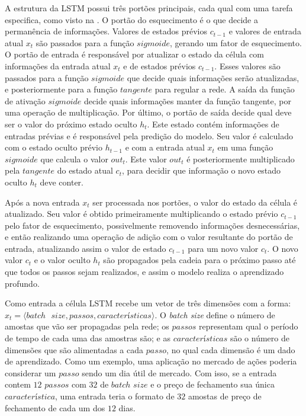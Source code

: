 
A estrutura da LSTM possui três portões principais, cada qual com uma tarefa especifica, como visto na . O portão do esquecimento é o que decide a permanência de informações. Valores de estados prévios $c_{t-1}$ e valores de entrada atual $x_t$ são passados para a função $sigmoide$, gerando um fator de esquecimento. O portão de entrada é responsável por atualizar o estado da célula com informações da entrada atual $x_t$ e de estados prévios $c_{t-1}$. Esses valores são passados para a função $sigmoide$ que decide quais informações serão atualizadas, e posteriormente para a função $tangente$ para regular a rede. A saída da função de ativação $sigmoide$ decide quais informações manter da função tangente, por uma operação de multiplicação. Por último, o portão de saída decide qual deve ser o valor do próximo estado oculto $h_t$. Este estado contém informações de entradas prévias e é responsável pela predição do modelo. Seu valor é calculado com o estado oculto prévio $h_{t-1}$ e com a entrada atual $x_t$ em uma função $sigmoide$ que calcula o valor $out_t$. Este valor $out_t$ é posteriormente multiplicado pela $tangente$ do estado atual $c_t$, para decidir que informação o novo estado oculto $h_t$ deve conter.

Após a nova entrada $x_t$ ser processada nos portões, o valor do estado da célula é atualizado. Seu valor é obtido primeiramente multiplicando o estado prévio $c_{t-1}$ pelo fator de esquecimento, possivelmente removendo informações desnecessárias, e então realizando uma operação de adição com o valor resultante do portão de entrada, atualizando assim o valor de estado $c_{t-1}$ para um novo valor $c_{t}$. O novo valor $c_t$ e o valor oculto $h_t$ são propagados pela cadeia para o próximo passo até que todos os passos sejam realizados, e assim o modelo realiza o aprendizado profundo.

Como entrada a célula LSTM recebe um vetor de três dimensões com a forma: $x_t = \langle {batch\textrm{ }size, passos, características} \rangle$. O \emph{batch size} define o número de amostas que vão ser propagadas pela rede; os $passos$ representam qual o período de tempo de cada uma das amostras são; e as $características$ são o número de dimensões que são alimentadas a cada $passo$, no qual cada dimensão é um dado de aprendizado. Como um exemplo, uma aplicação no mercado de ações poderia considerar um $passo$ sendo um dia útil de mercado. Com isso, se a entrada contem $12$ $passos$ com $32$ de $batch$ $size$ e o preço de fechamento sua única $característica$, uma entrada teria o formato de $32$ amostas de preço de fechamento de cada um dos $12$ dias.

